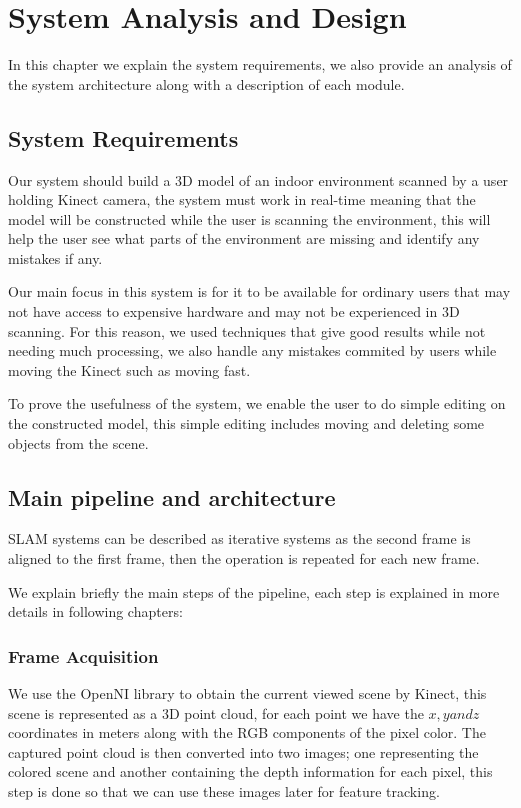 \chapter{System Analysis and Design}

In this chapter we explain the system requirements, we also provide an analysis of the system architecture along with a description of each module.

\section{System Requirements}

Our system should build a 3D model of an indoor environment scanned by a user holding Kinect camera, the system must work in real-time meaning that the model will be constructed while the user is scanning the environment, this will help the user see what parts of the environment are missing and identify any mistakes if any.

Our main focus in this system is for it to be available for ordinary users that may not have access to expensive hardware and may not be experienced in 3D scanning. For this reason, we used techniques that give good results while not needing much processing, we also handle any mistakes commited by users while moving the Kinect such as moving fast.

To prove the usefulness of the system, we enable the user to do simple editing on the constructed model, this simple editing includes moving and deleting some objects from the scene.
\pagebreak

\section{Main pipeline and architecture}

SLAM systems can be described as iterative systems as the second frame is aligned to the first frame, then the operation is repeated for each new frame.

We explain briefly the main steps of the pipeline, each step is explained in more details in following chapters:

\subsection{Frame Acquisition}
   We use the OpenNI library to obtain the current viewed scene by Kinect, this scene is represented as a 3D point cloud, for each point we have the $x, y and  z$ coordinates in meters along with the RGB components of the pixel color.
   The captured point cloud is then converted into two images; one representing the colored scene and another containing the depth information for each pixel, this step is done so that we can use these images later for feature tracking.

